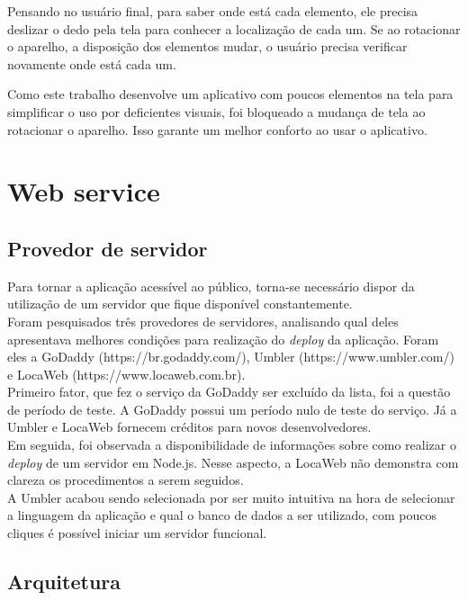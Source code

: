 \documentclass[
	12pt,				%
	oneside,			%
	a4paper,			%
	brazil				%
]{abntex2}
\begin{document}
{Pensando no usuário final, para saber onde está cada elemento, ele precisa deslizar o dedo pela tela para conhecer a localização de cada um. Se ao rotacionar o aparelho, a disposição dos elementos mudar, o usuário precisa verificar novamente onde está cada um.

Como este trabalho desenvolve um aplicativo com poucos elementos na tela para simplificar o uso por deficientes visuais, foi bloqueado a mudança de tela ao rotacionar o aparelho. Isso garante um melhor conforto ao usar o aplicativo.


\section{Web service}

\subsection{Provedor de servidor}

Para tornar a aplicação acessível ao público, torna-se necessário dispor da utilização de um servidor que fique disponível constantemente. \\

Foram pesquisados três provedores de servidores, analisando qual deles apresentava melhores condições para realização do \textit{deploy} da aplicação. Foram eles a GoDaddy (https://br.godaddy.com/), Umbler (https://www.umbler.com/) e LocaWeb (https://www.locaweb.com.br).\\

Primeiro fator, que fez o serviço da GoDaddy ser excluído da lista, foi a questão de período de teste. A GoDaddy possui um período nulo de teste do serviço. Já a Umbler e LocaWeb fornecem créditos para novos desenvolvedores.\\

Em seguida, foi observada a disponibilidade de informações sobre como realizar o \textit{deploy} de um servidor em Node.js. Nesse aspecto, a LocaWeb não demonstra com clareza os procedimentos a serem seguidos.\\

A Umbler acabou sendo selecionada por ser muito intuitiva na hora de selecionar a linguagem da aplicação e qual o banco de dados a ser utilizado, com poucos cliques é possível iniciar um servidor funcional.


\subsection{Arquitetura}

}
\end{document}
